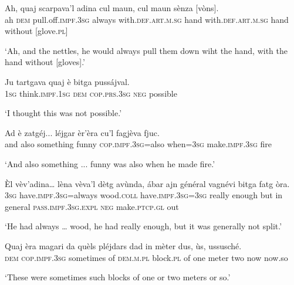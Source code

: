 \begin{linenumbers}
\gll  Ah, quaj scarpava’l adina cul maun, cul maun sènza [vòns].  \\
ah  \textsc{dem} pull.off.\textsc{impf.3sg} always with.\textsc{def.art.m.sg} hand with.\textsc{def.art.m.sg} hand without [glove.\textsc{pl}]  \\
\end{linenumbers}
\medskip
\glt `Ah, and the nettles, he would always pull them down wiht the hand, with the hand without [gloves].'
\medskip

\begin{linenumbers}
\gll  Ju tartgava quaj è bitga pussájval.  \\
 \textsc{1sg} think.\textsc{impf.1sg} \textsc{dem} \textsc{cop.prs.3sg} \textsc{neg} possible \\
\end{linenumbers} 
\medskip
\glt `I thought this was not possible.'
\medskip

\begin{linenumbers}
\gll  Ad è zatgéj... léjgar èr’èra cu’l fagjèva fjuc.  \\
 and also something funny \textsc{cop.impf.3sg=}also when=\textsc{3sg} make.\textsc{impf.3sg} fire \\
\end{linenumbers}
\medskip
\glt `And also something ... funny was also when he made fire.'
\medskip

\begin{linenumbers}
\gll Èl vèv’adina… lèna vèva’l dètg avùnda, ábar ajn général vagnévi bitga fatg òra.   \\
 \textsc{3sg} have.\textsc{impf.3sg=}always wood.\textsc{coll} have.\textsc{impf.3sg=3sg} really enough but in general \textsc{pass.impf.3sg.expl} \textsc{neg} make.\textsc{ptcp.gl} out  \\
\end{linenumbers}
\medskip
\glt `He had always … wood, he had really enough, but it was generally not split.'
\medskip

\begin{linenumbers}
\gll  Quaj èra magari da quèls pléjdars dad in mèter dus, ùs, ussusché. \\
 \textsc{dem} \textsc{cop.impf.3sg} sometimes of  \textsc{dem.m.pl} block.\textsc{pl} of one meter two now now.so  \\
\end{linenumbers}
\medskip
\glt `These were sometimes such blocks of one or two meters or so.'
\medskip

